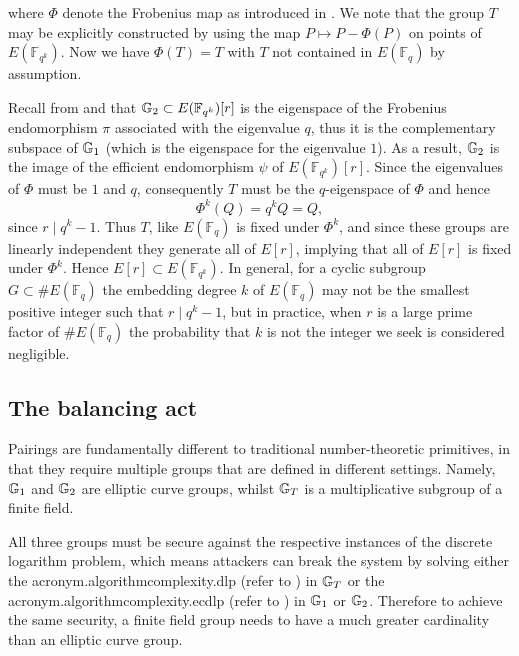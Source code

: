 where $\Phi$ denote the Frobenius map as introduced in . We note that the group $T$ may be explicitly constructed by using the map $P \mapsto P - \Phi(P)$ on points of $E(\mathbb{F}_{q^k})$. Now we have $\Phi(T) = T$ with $T$ not contained in $E(\mathbb{F}_q)$ by assumption. 

Recall from  and \cite{chapman17} that $\mathbb{G}_2 \subset E(\mathbb{F}_{q^k})[r]$ is the eigenspace of the Frobenius endomorphism $\pi$ associated with the eigenvalue $q$, thus it is the complementary subspace of $\mathbb{G}_1$ (which is the eigenspace for the eigenvalue $1$). As a result, $\mathbb{G}_2$ is the image of the efficient endomorphism $\psi$ of $E(\mathbb{F}_{q^k})[r]$. Since the eigenvalues of $\Phi$ must be $1$ and $q$, consequently $T$ must be the $q$-eigenspace of $\Phi$ and hence $$\Phi^k(Q) = q^k Q = Q,$$
since $r \mid q^k - 1$. Thus $T$, like $E(\mathbb{F}_q)$ is fixed under $\Phi^k$, and since these groups are linearly independent they generate all of $E[r]$, implying that all of $E[r]$ is fixed under $\Phi^k$. Hence $E[r] \subset E(\mathbb{F}_{q^k})$. In general, for a cyclic subgroup $G \subset \#E(\mathbb{F}_q)$ the embedding degree $k$ of $E(\mathbb{F}_q)$ may not be the smallest positive integer such that $r \mid q^k - 1$, but in practice, when $r$ is a large prime factor of $\#E(\mathbb{F}_q)$ the probability that $k$ is not the integer we seek is considered negligible.

\subsection{The balancing act}
\label{ssec:thebalancingact}

Pairings are fundamentally different to traditional number-theoretic primitives, in that they require multiple groups that are defined in different settings. Namely, $\mathbb{G}_1$ and $\mathbb{G}_2$ are elliptic curve groups, whilst $\mathbb{G}_T$ is a multiplicative subgroup of a finite field. 

All three groups must be secure against the respective instances of the discrete logarithm problem, which means attackers can break the system by solving either the \acs{acronym.algorithmcomplexity.dlp} (refer to ) in $\mathbb{G}_T$ or the \acs{acronym.algorithmcomplexity.ecdlp} (refer to ) in $\mathbb{G}_1$ or $\mathbb{G}_2$. Therefore to  achieve
the same security, a finite field group needs to have a much greater cardinality than an elliptic curve group.

